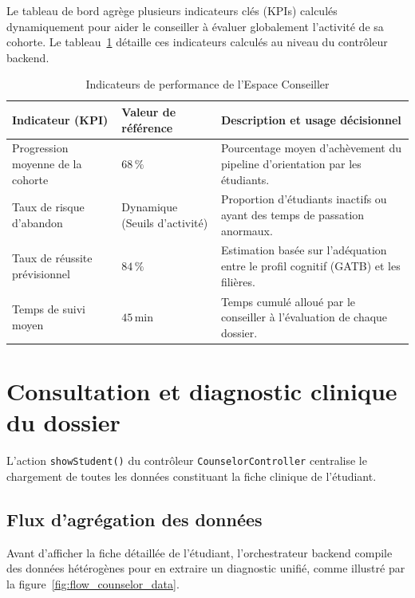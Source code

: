 Le tableau de bord agrège plusieurs indicateurs clés (KPIs) calculés dynamiquement pour aider le conseiller à évaluer globalement l'activité de sa cohorte. Le tableau~\ref{tab:counselor_kpis} détaille ces indicateurs calculés au niveau du contrôleur backend.

\begin{table}[H]
\centering
\small
\begin{tabular}{|p{4.5cm}|p{3.5cm}|p{7cm}|}
\hline
\rowcolor{blue!15}
\textbf{Indicateur (KPI)} & \textbf{Valeur de référence} & \textbf{Description et usage décisionnel} \\
\hline
Progression moyenne de la cohorte & $68\,\%$ & Pourcentage moyen d'achèvement du pipeline d'orientation par les étudiants. \\
\hline
Taux de risque d'abandon & Dynamique (Seuils d'activité) & Proportion d'étudiants inactifs ou ayant des temps de passation anormaux. \\
\hline
Taux de réussite prévisionnel & $84\,\%$ & Estimation basée sur l'adéquation entre le profil cognitif (GATB) et les filières. \\
\hline
Temps de suivi moyen & $45$\,min & Temps cumulé alloué par le conseiller à l'évaluation de chaque dossier. \\
\hline
\end{tabular}
\caption{Indicateurs de performance de l'Espace Conseiller}
\label{tab:counselor_kpis}
\end{table}

\section{Consultation et diagnostic clinique du dossier}
\label{sec:diagnostic_clinique}

L'action \texttt{showStudent()} du contrôleur \texttt{CounselorController} centralise le chargement de toutes les données constituant la fiche clinique de l'étudiant.

\subsection{Flux d'agrégation des données}

Avant d'afficher la fiche détaillée de l'étudiant, l'orchestrateur backend compile des données hétérogènes pour en extraire un diagnostic unifié, comme illustré par la figure~\ref{fig:flow_counselor_data}.

